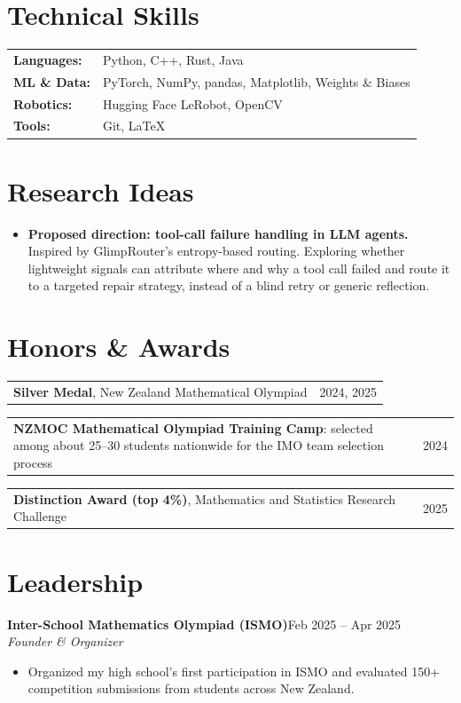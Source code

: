 \documentclass[11pt,letterpaper]{article}
\makeatletter
\newcommand{\entry}[4]{%
  \par\vspace{3pt}\noindent
  \textbf{#1}\hfill #2\\
  \textit{#3}\hfill\textit{#4}\par}
\newcommand{\oneline}[2]{\par\noindent\begin{tabularx}{\linewidth}{@{}X r@{}}#1 & #2\end{tabularx}\par}
\makeatother
\begin{document}
\section*{Technical Skills}
\begin{tabular}{@{}l l@{}}
  \textbf{Languages:}  & Python, C++, Rust, Java \\
  \textbf{ML \& Data:} & PyTorch, NumPy, pandas, Matplotlib, Weights \& Biases \\
  \textbf{Robotics:}   & Hugging Face LeRobot, OpenCV \\
  \textbf{Tools:}      & Git, \LaTeX
\end{tabular}

\section*{Research Ideas}
\begin{itemize}
  \item \textbf{Proposed direction: tool-call failure handling in LLM agents.} Inspired by
        GlimpRouter's entropy-based routing. Exploring whether lightweight signals can attribute
        where and why a tool call failed and route it to a targeted repair strategy, instead of a
        blind retry or generic reflection.
\end{itemize}

\section*{Honors \& Awards}
\oneline{\textbf{Silver Medal}, New Zealand Mathematical Olympiad}{2024, 2025}
\oneline{\textbf{NZMOC Mathematical Olympiad Training Camp}: selected among about 25--30 students
         nationwide for the IMO team selection process}{2024}
\oneline{\textbf{Distinction Award (top 4\%)}, Mathematics and Statistics Research Challenge}{2025}

\section*{Leadership}
\entry{Inter-School Mathematics Olympiad (ISMO)}{Feb 2025 -- Apr 2025}{Founder \& Organizer}{}
\begin{itemize}
  \item Organized my high school's first participation in ISMO and evaluated 150+ competition
        submissions from students across New Zealand.
\end{itemize}
\end{document}
